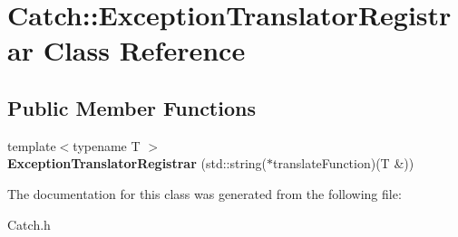 \hypertarget{class_catch_1_1_exception_translator_registrar}{\section{Catch\-:\-:Exception\-Translator\-Registrar Class Reference}
\label{class_catch_1_1_exception_translator_registrar}
}
\subsection*{Public Member Functions}
\begin{DoxyCompactItemize}
\item 
\hypertarget{class_catch_1_1_exception_translator_registrar_aa73229de911f26b1df6c6c87c4d9e04e}{{\footnotesize template$<$typename T $>$ }\\{\bfseries Exception\-Translator\-Registrar} (std\-::string($\ast$translate\-Function)(T \&))}\label{class_catch_1_1_exception_translator_registrar_aa73229de911f26b1df6c6c87c4d9e04e}

\end{DoxyCompactItemize}


The documentation for this class was generated from the following file\-:\begin{DoxyCompactItemize}
\item 
Catch.\-h\end{DoxyCompactItemize}
